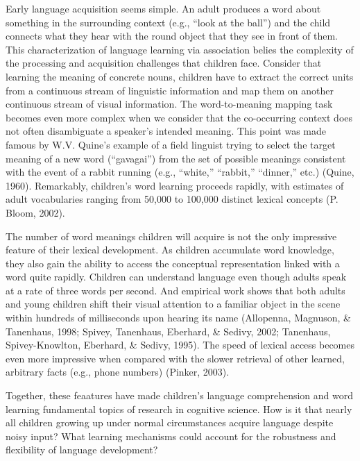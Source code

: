 \documentclass[oneside]{report}
\begin{document}
Early language acquisition seems simple. An adult produces a word about
something in the surrounding context (e.g., ``look at the ball'') and
the child connects what they hear with the round object that they see in
front of them. This characterization of language learning via
association belies the complexity of the processing and acquisition
challenges that children face. Consider that learning the meaning of
concrete nouns, children have to extract the correct units from a
continuous stream of linguistic information and map them on another
continuous stream of visual information. The word-to-meaning mapping
task becomes even more complex when we consider that the co-occurring
context does not often disambiguate a speaker's intended meaning. This
point was made famous by W.V. Quine's example of a field linguist trying
to select the target meaning of a new word (``gavagai'') from the set of
possible meanings consistent with the event of a rabbit running (e.g.,
``white,'' ``rabbit,'' ``dinner,'' etc.) (Quine, 1960). Remarkably,
children's word learning proceeds rapidly, with estimates of adult
vocabularies ranging from 50,000 to 100,000 distinct lexical concepts
(P. Bloom, 2002).

The number of word meanings children will acquire is not the only
impressive feature of their lexical development. As children accumulate
word knowledge, they also gain the ability to access the conceptual
representation linked with a word quite rapidly. Children can understand
language even though adults speak at a rate of three words per second.
And empirical work shows that both adults and young children shift their
visual attention to a familiar object in the scene within hundreds of
milliseconds upon hearing its name (Allopenna, Magnuson, \& Tanenhaus,
1998; Spivey, Tanenhaus, Eberhard, \& Sedivy, 2002; Tanenhaus,
Spivey-Knowlton, Eberhard, \& Sedivy, 1995). The speed of lexical access
becomes even more impressive when compared with the slower retrieval of
other learned, arbitrary facts (e.g., phone numbers) (Pinker, 2003).

Together, these feaatures have made children's language comprehension
and word learning fundamental topics of research in cognitive science.
How is it that nearly all children growing up under normal circumstances
acquire language despite noisy input? What learning mechanisms could
account for the robustness and flexibility of language development?
\end{document}
